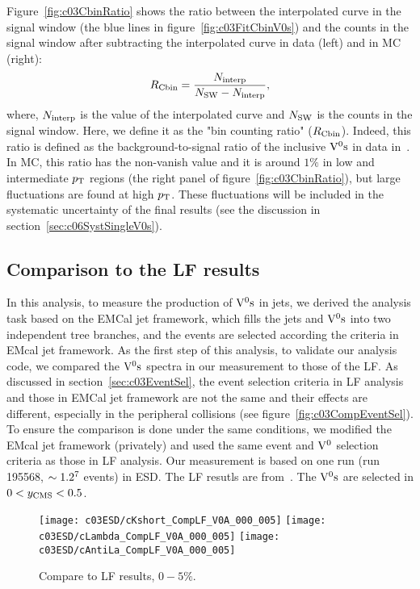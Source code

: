 Figure~\ref{fig:c03CbinRatio} shows the ratio between the interpolated curve
in the signal window (the blue lines in figure~\ref{fig:c03FitCbinV0s}) and
the counts in the signal window after subtracting the interpolated curve in
data (left) and in MC (right):
\begin{equation}\label{eq:c03CbinR}
R_{\rm Cbin}=\frac{N_{\rm interp}}{N_{\rm SW}-N_{\rm interp}},
\end{equation}
where, $N_{\rm interp}$ is the value of the interpolated curve and
$N_{\rm SW}$ is the counts in the signal window.
Here, we define it as the "bin counting ratio" ($R_{\rm Cbin}$).
Indeed, this ratio is defined as the background-to-signal ratio of the
inclusive ${\rm V}^{0}{\rm s}$ in data in~\cite{Ali2012:ana501}.
In MC, this ratio has the non-vanish value and it is around $1\%$ in low and
intermediate $p_{\rm T}$ regions (the right panel of figure~\ref{fig:c03CbinRatio}),
but large fluctuations are found at high $p_{\rm T}$.
These fluctuations will be included in the systematic uncertainty of the
final results (see the discussion in section~\ref{sec:c06SystSingleV0s}).

\subsection{Comparison to the LF results}

In this analysis,
to measure the production of ${\rm V}^{0}{\rm s}$ in jets,
we derived the analysis task based on the EMCal jet framework,
which fills the jets and ${\rm V}^{0}{\rm s}$ into two independent tree branches,
and the events are selected according the criteria in EMcal jet framework.
As the first step of this analysis, to validate our analysis code,
we compared the ${\rm V}^{0}{\rm s}$ spectra in our measurement to those of the LF.
As discussed in section~\ref{sec:c03EventSel},
the event selection criteria in LF analysis and those in EMCal jet framework
are not the same and their effects are different,
especially in the peripheral collisions (see figure~\ref{fig:c03CompEventSel}).
To ensure the comparison is done under the same conditions,
we modified the EMcal jet framework (privately) and used the same event
and ${\rm V}^{0}$ selection criteria as those in LF analysis.
Our measurement is based on one run (run 195568,
$\sim 1.2\time 10^{7}$ events) in ESD.
The LF resutls are from~\cite{Abelev:2013haa}.
The ${\rm V}^{0}{\rm s}$ are selected in $0<y_{\rm CMS}<0.5$.

\begin{figure}[htb]
\begin{center}
\texttt{[image: c03ESD/cKshort\_CompLF\_V0A\_000\_005]}
\texttt{[image: c03ESD/cLambda\_CompLF\_V0A\_000\_005]}
\texttt{[image: c03ESD/cAntiLa\_CompLF\_V0A\_000\_005]}
\caption{Compare to LF results, $0-5\%$.}
\label{fig:c03Comp000005ESD}
\end{center}
\end{figure}

